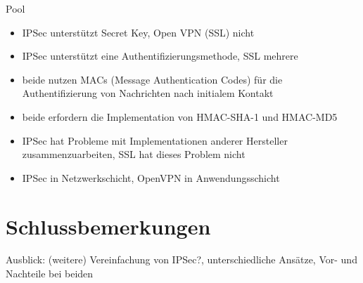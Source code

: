 \documentclass[12pt]{scrartcl}
\begin{document}
Pool
\begin{itemize}
	\item IPSec unterstützt Secret Key\cite{Alshamsi2005}, Open VPN (SSL) nicht
	\item IPSec unterstützt eine Authentifizierungsmethode, SSL mehrere\cite{Alshamsi2005}
	\item beide nutzen MACs (Message Authentication Codes) für die Authentifizierung von Nachrichten nach initialem Kontakt\cite{Alshamsi2005}
	\item beide erfordern die Implementation von HMAC-SHA-1 und HMAC-MD5\cite{Alshamsi2005}
	\item IPSec hat Probleme mit Implementationen anderer Hersteller zusammenzuarbeiten, SSL hat dieses Problem nicht\cite{Alshamsi2005}
	\item IPSec in Netzwerkschicht, OpenVPN in Anwendungsschicht
\end{itemize}

\section{Schlussbemerkungen}
Ausblick: (weitere) Vereinfachung von IPSec?, unterschiedliche Ansätze, Vor- und Nachteile bei beiden

\newpage

\printbibliography
{}


\newpage
{}
\end{document}
